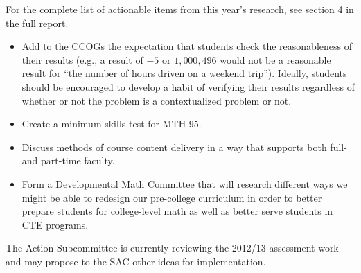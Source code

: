\begin{description}
For the complete list of actionable items from this year's research, see section 4 in the full report.

\begin{itemize}
\item Add to the CCOGs the expectation that students check the reasonableness of their results (e.g., a result of $-5$ or $1{,}000{,}496$ would not be a reasonable result for ``the number of hours driven on a weekend trip'').  Ideally, students should be encouraged to develop a habit of verifying their results regardless of whether or not the problem is a contextualized problem or not.
\item Create a minimum skills test for MTH 95.
\item Discuss methods of course content delivery in a way that supports both full- and part-time faculty.
\item Form a Developmental Math Committee that will research different ways we might be able to redesign our pre-college curriculum in order to better prepare students for college-level math as well as better serve students in CTE programs.
\end{itemize}

\end{description}

The Action Subcommittee is currently reviewing the 2012/13 assessment work and may propose to the SAC other ideas for implementation.


